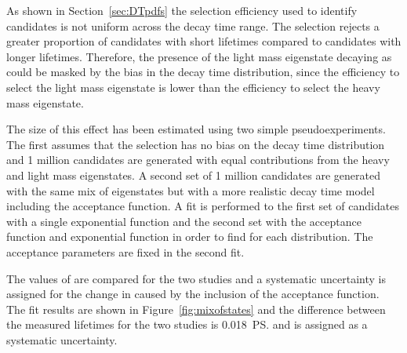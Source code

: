 As shown in Section~\ref{sec:DTpdfs} the selection efficiency used to identify \bsmumu candidates is not uniform across the decay time range. The selection rejects a greater proportion of candidates with short lifetimes compared to candidates with longer lifetimes. Therefore, the presence of the light \bs mass eigenstate decaying as \bsmumu could be masked by the bias in the decay time distribution, since the efficiency to select the light \bs mass eigenstate is lower than the efficiency to select the heavy \bs mass eigenstate.

The size of this effect has been estimated using two simple pseudoexperiments. The first assumes that the selection has no bias on the decay time distribution and 1 million candidates are generated with equal contributions from the heavy and light \bs mass eigenstates. %
 A second set of 1 million candidates are generated with the same mix of eigenstates but with a more realistic decay time model including the \bsmumu acceptance function. A fit is performed to the first set of candidates with a single exponential function and the second set with the acceptance function and exponential function in order to find \tmumu for each distribution. The acceptance parameters are fixed in the second fit.

The values of \tmumu are compared for the two studies and a systematic uncertainty is assigned for the change in \tmumu caused by the inclusion of the acceptance function. The fit results are shown in Figure~\ref{fig:mixofstates} and the difference between the measured lifetimes for the two studies is 0.018~\ps and is assigned as a systematic uncertainty.

